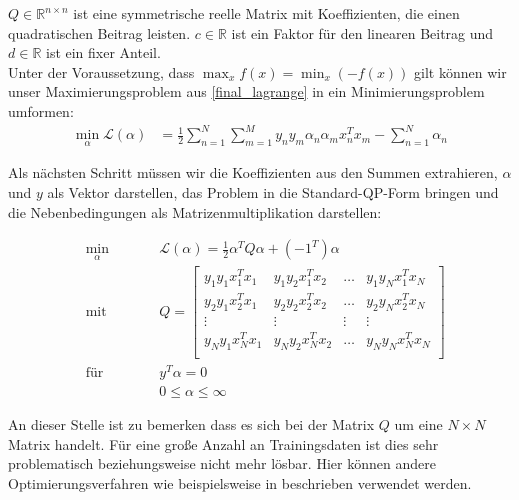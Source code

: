\documentclass[a4paper,11pt,twoside]{scrreprt}
\newcommand{\Lagr}{\mathcal{L}}
\begin{document}
$Q \in \mathbb{R}^{n \times n}$ ist eine symmetrische reelle Matrix mit Koeffizienten, die einen quadratischen Beitrag leisten. $c \in \mathbb{R}$ ist ein Faktor für den linearen Beitrag und $d \in \mathbb{R}$ ist ein fixer Anteil. \\

Unter der Voraussetzung, dass $\max_{x} f(x) = \min_{x} (-f(x))$ gilt können wir unser Maximierungsproblem aus \autoref{final_lagrange} in ein Minimierungsproblem umformen:
\begin{equation} \label{qp_adapt1}
	\begin{aligned}
		\min_{\alpha} \Lagr(\alpha) &= \frac{1}{2} \sum_{n=1}^{N} \sum_{m=1}^{M} y_{n} y_{m} \alpha_{n} \alpha_{m} x_{n}^{T} x_{m} - \sum_{n=1}^{N} \alpha_{n}
	\end{aligned}
\end{equation}

Als nächsten Schritt müssen wir die Koeffizienten aus den Summen extrahieren, $\alpha$ und $y$ als Vektor darstellen, das Problem in die Standard-QP-Form bringen und die Nebenbedingungen als Matrizenmultiplikation darstellen:


\begin{subequations} \label{qp1}
	\begin{alignat}{2}
		&\!\min_{\alpha}        &\qquad& \Lagr(\alpha) = \frac{1}{2} \alpha^{T} Q \alpha + (-1^T) \alpha \label{eq:qp1}\\
		&\text{mit} &      & Q = \begin{bmatrix} 
			y_{1}y_{1}x_{1}^{T}x_{1} & y_{1}y_{2}x_{1}^{T}x_{2} & \dots & y_{1}y_{N}x_{1}^{T}x_{N}\\
			y_{2}y_{1}x_{2}^{T}x_{1} & y_{2}y_{2}x_{2}^{T}x_{2} & \dots & y_{2}y_{N}x_{2}^{T}x_{N}\\
			\vdots & \vdots & \vdots & \vdots\\
			y_{N}y_{1}x_{N}^{T}x_{1} & y_{N}y_{2}x_{N}^{T}x_{2} & \dots & y_{N}y_{N}x_{N}^{T}x_{N}\\ 
	\end{bmatrix}\\
&\text{für} & & y^{T} \alpha = 0\\
& & & 0 \leq \alpha \leq \infty
	\end{alignat}
\end{subequations}

An dieser Stelle ist zu bemerken dass es sich bei der Matrix $Q$ um eine $N \times N$ Matrix handelt. Für eine große Anzahl an Trainingsdaten ist dies sehr problematisch beziehungsweise nicht mehr lösbar. Hier können andere Optimierungsverfahren wie beispielsweise in \textcite{platt_sequential_1998} beschrieben verwendet werden. \\
\end{document}
